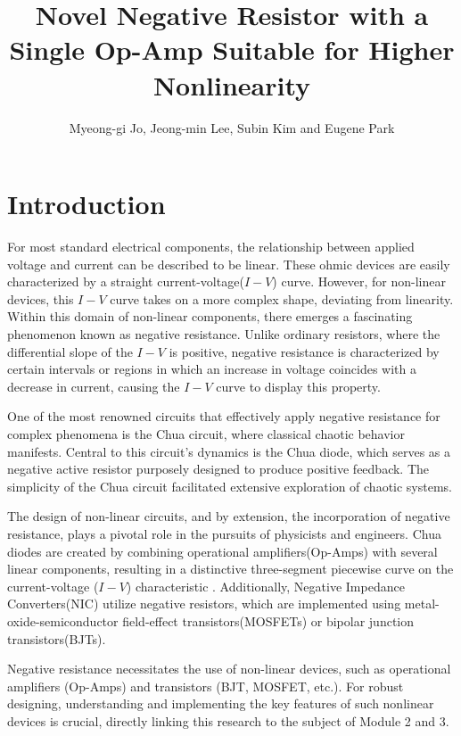 \documentclass[12pt]{article}
\begin{document}
\title{Novel Negative Resistor with a Single Op-Amp Suitable for Higher Nonlinearity}

\author{Myeong-gi Jo, Jeong-min Lee, Subin Kim and Eugene Park}

\maketitle

\section{Introduction}


For most standard electrical components, the relationship between applied voltage and current can be described to be linear. These ohmic devices are easily characterized by a straight current-voltage(\(I-V\)) curve. However, for non-linear devices, this \(I-V\) curve takes on a more complex shape, deviating from linearity. Within this domain of non-linear components, there emerges a fascinating phenomenon known as negative resistance. Unlike ordinary resistors, where the differential slope of the \(I-V\) is positive, negative resistance is characterized by certain intervals or regions in which an increase in voltage coincides with a decrease in current, causing the \(I-V\) curve to display this property.

One of the most renowned circuits that effectively apply negative resistance for complex phenomena is the Chua circuit, where classical chaotic behavior manifests. Central to this circuit's dynamics is the Chua diode, which serves as a negative active resistor purposely designed to produce positive feedback. The simplicity of the Chua circuit facilitated extensive exploration of chaotic systems\cite{impact_chua}.

The design of non-linear circuits, and by extension, the incorporation of negative resistance, plays a pivotal role in the pursuits of physicists and engineers. Chua diodes are created by combining operational amplifiers(Op-Amps) with several linear components, resulting in a distinctive three-segment piecewise curve on the current-voltage ($I-V$) characteristic \cite{chua_circuit}. Additionally, Negative Impedance Converters(NIC) utilize negative resistors, which are implemented using metal-oxide-semiconductor field-effect transistors(MOSFETs) or bipolar junction transistors(BJTs)\cite{NIC_BJT,NIC_MOSFET,NIC_MOSFET2}.

Negative resistance necessitates the use of non-linear devices, such as operational amplifiers (Op-Amps) and transistors (BJT, MOSFET, etc.). For robust designing, understanding and implementing the key features of such nonlinear devices is crucial, directly linking this research to the subject of Module 2 and 3. 
\end{document}
